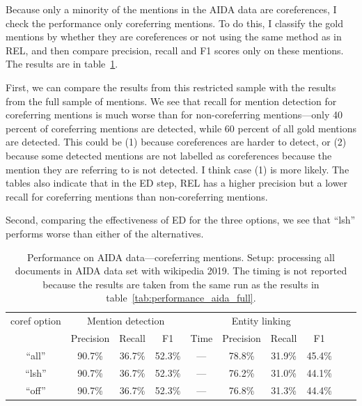 \documentclass[a4paper,11pt]{article}
\numberwithin{equation}{section} %
\begin{document}
Because only a minority of the mentions in the AIDA data are coreferences, I check the performance only coreferring mentions. To do this, I classify the gold mentions by whether they are coreferences or not using the same method as in REL, and then compare precision, recall and F1 scores only on these mentions. The results are in table~\ref{tab:performance_aida_corefs}. 

First, we can compare the results from this restricted sample with the results from the full sample of mentions. We see that recall for mention detection for coreferring mentions is much worse than for non-coreferring mentions---only 40 percent of coreferring mentions are detected, while 60 percent of all gold mentions are detected. 
This could be (1) because coreferences are harder to detect, or (2) because some detected mentions are not labelled as coreferences because the mention they are referring to is not detected. I think case (1) is more likely.
The tables also indicate that in the ED step, REL has a higher precision but a lower recall for coreferring mentions than non-coreferring mentions. 

Second, comparing the effectiveness of ED for the three options, we see that ``lsh'' performs worse than either of the alternatives.



\begin{table}
 \begin{tabular}{c c c c c c c c c c}
\hline
 coref option & \multicolumn{3}{c}{Mention detection} & \multicolumn{4}{c}{Entity linking}  \\
        & Precision & Recall & F1 & Time & Precision & Recall & F1 \\
 \hline 
 ``all'' & 90.7\% & 36.7\% & 52.3\% & --- & 78.8\% & 31.9\% & 45.4\% \\  
 ``lsh'' & 90.7\% & 36.7\% & 52.3\% & --- & 76.2\% & 31.0\% & 44.1\% \\
 ``off'' & 90.7\% & 36.7\% & 52.3\% & --- & 76.8\% & 31.3\% & 44.4\% \\ 
\hline 
\end{tabular}
\caption{Performance on AIDA data---coreferring mentions. Setup: processing all documents in AIDA data set with wikipedia 2019. The timing is not reported because the results are taken from the same run as the results in table~\ref{tab:performance_aida_full}.}
\label{tab:performance_aida_corefs}
\end{table}
\end{document}
